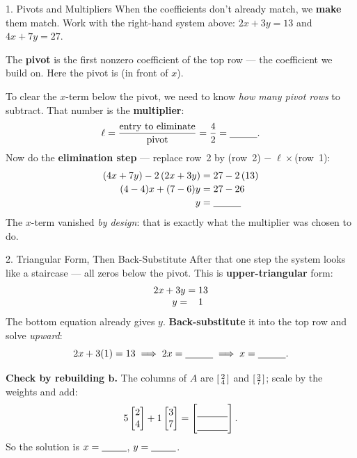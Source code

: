 \documentclass[10pt]{article}
\newcommand{\bb}{\mathbf{b}}
\begin{document}
\begin{notesbox}{1. Pivots and Multipliers}
When the coefficients don't already match, we \textbf{make} them match. Work with the right-hand
system above: $2x+3y=13$ and $4x+7y=27$.

\vspace{3pt}
The \textbf{pivot} is the first nonzero coefficient of the top row --- the coefficient we build on.
Here the pivot is \blank{1.0cm} (in front of $x$).

\vspace{3pt}
To clear the $x$-term below the pivot, we need to know \emph{how many pivot rows} to subtract. That
number is the \textbf{multiplier}:
\[
  \ell = \frac{\text{entry to eliminate}}{\text{pivot}} = \frac{4}{2} = \blank{1.0cm}.
\]
Now do the \textbf{elimination step} --- replace row~2 by (row~2) $-\;\ell\times$(row~1):
\[
  \begin{array}{r@{}c@{}l}
    (4x + 7y) - 2\,(2x + 3y) &{}={}& 27 - 2\,(13) \\[2pt]
    (4-4)x + (7-6)y &{}={}& 27 - 26 \\[2pt]
    y &{}={}& \blank{1.0cm}
  \end{array}
\]
The $x$-term vanished \emph{by design}: that is exactly what the multiplier was chosen to do.
\end{notesbox}

\begin{notesbox}{2. Triangular Form, Then Back-Substitute}
After that one step the system looks like a staircase --- all zeros below the pivot. This is
\textbf{upper-triangular} form:
\[
  \begin{array}{r@{}c@{}l}
    2x &{}+ 3y ={}& 13 \\
       & y ={}& 1
  \end{array}
\]
The bottom equation already gives $y$. \textbf{Back-substitute} it into the top row and solve
\emph{upward}:
\[
  2x + 3(1) = 13 \;\Longrightarrow\; 2x = \blank{1.0cm} \;\Longrightarrow\; x = \blank{1.0cm}.
\]

\vspace{2pt}
\textbf{Check by rebuilding $\bb$.} The columns of $A$ are $\begin{bsmallmatrix} 2\\4 \end{bsmallmatrix}$
and $\begin{bsmallmatrix} 3\\7 \end{bsmallmatrix}$; scale by the weights and add:
\[
  5\begin{bmatrix} 2 \\ 4 \end{bmatrix} + 1\begin{bmatrix} 3 \\ 7 \end{bmatrix}
  = \begin{bmatrix}\rule{0pt}{1.1em}\blank{1.1cm}\\[2pt]\blank{1.1cm}\end{bmatrix}.
\]
So the solution is $x=\blank{0.9cm}$, $y=\blank{0.9cm}$.
\end{notesbox}
\end{document}
